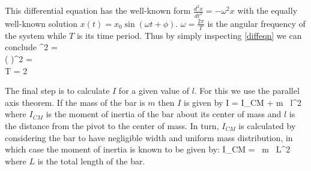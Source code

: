    This differential equation has the well-known form $\frac{d^2 x}{dt^2} = - \omega^2 x$ with the equally well-known solution $x(t) = x_0 \sin(\omega t + \phi)$. $\omega = \frac{2 \pi}{T}$ is the angular frequency of the system while $T$ is its time period. Thus by simply inspecting \eqref{diffeqn} we can conclude
   \beqc
      \omega^2 = \\
      \imply \big(  \big)^2 = \\
      \imply T = 2 \pi {}
   \eeqc



   The final step is to calculate $I$ for a given value of $l$. For this we use the parallel axis theorem. If the mass of the bar is $m$ then $I$ is given by
   \beq \label{parallel_axis}
      I = I_{CM} + m \, l^2
   \eeq
   where $I_{CM}$ is the moment of inertia of the bar about its center of mass and $l$ is the distance from the pivot to the center of mass. In turn, $I_{CM}$ is calculated by considering the bar to have negligible width and uniform mass distribution, in which case the moment of inertia is known to be given by:
   \beq \label{ICM}
      I_{CM} =  \, m \, L^2
   \eeq
   where $L$ is the total length of the bar.

